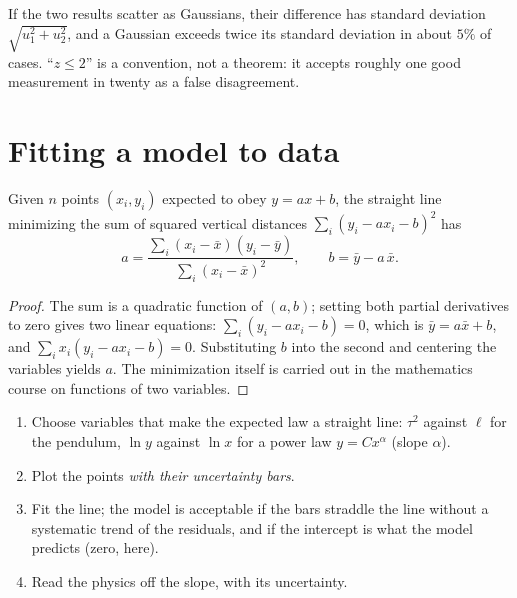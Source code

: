 \begin{remark}[Why 2]\label{rem:b1:units-dimensions:why2}
If the two results scatter as Gaussians, their difference has standard
deviation $\sqrt{u_1^2 + u_2^2}$, and a Gaussian exceeds twice its
standard deviation in about $5\%$ of cases. ``$z \leq 2$'' is a
convention, not a theorem: it accepts roughly one good measurement in
twenty as a false disagreement.
\end{remark}

\section{Fitting a model to data}

\begin{proposition}\label{prop:b1:units-dimensions:regression}
Given $n$ points $(x_i, y_i)$ expected to obey $y = a x + b$, the
straight line minimizing the sum of squared vertical distances
$\sum_i (y_i - a x_i - b)^2$ has
\[
a = \frac{\sum_i (x_i - \bar x)(y_i - \bar y)}{\sum_i (x_i - \bar x)^2},
\qquad
b = \bar y - a\,\bar x .
\]
\end{proposition}

\begin{proof}
The sum is a quadratic function of $(a, b)$; setting both partial
derivatives to zero gives two linear equations: $\sum_i (y_i - ax_i - b) = 0$,
which is $\bar y = a \bar x + b$, and $\sum_i x_i (y_i - ax_i - b) = 0$.
Substituting $b$ into the second and centering the variables yields $a$.
The minimization itself is carried out in the mathematics course on
functions of two variables.
\end{proof}

\begin{method}\label{met:b1:units-dimensions:fit}
\begin{enumerate}
  \item Choose variables that make the expected law a straight line:
        $\tau^2$ against $\ell$ for the pendulum, $\ln y$ against
        $\ln x$ for a power law $y = Cx^\alpha$ (slope $\alpha$).
  \item Plot the points \emph{with their uncertainty bars}.
  \item Fit the line; the model is acceptable if the bars straddle the
        line without a systematic trend of the residuals, and if the
        intercept is what the model predicts (zero, here).
  \item Read the physics off the slope, with its uncertainty.
\end{enumerate}
\end{method}

